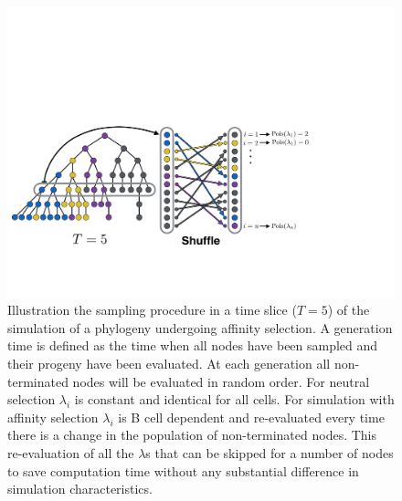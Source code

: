 \begin{figure}
    \centering
    \includegraphics[width=1\textwidth]{figures/tree_iteration.pdf}
    \caption{
        \label{fig:tree_iteration}
        Illustration the sampling procedure in a time slice ($T=5$) of the simulation of a phylogeny undergoing affinity selection.
        A generation time is defined as the time when all nodes have been sampled and their progeny have been evaluated.
        At each generation all non-terminated nodes will be evaluated in random order.
        For neutral selection $\lambda_i$ is constant and identical for all cells.
        For simulation with affinity selection $\lambda_i$ is B cell dependent and re-evaluated every time there is a change in the population of non-terminated nodes.
        This re-evaluation of all the $\lambda$s that can be skipped for a number of nodes to save computation time without any substantial difference in simulation characteristics.
    }
\end{figure}


